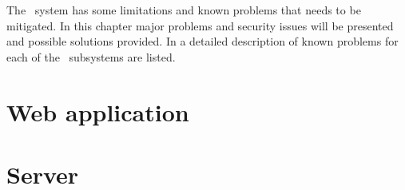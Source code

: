 The \appName\ system has some limitations and known problems that needs to be
mitigated. In this chapter major problems and security issues will be presented
and possible solutions provided. In  a detailed
description of known problems for each of the \appName\ subsystems are listed.

\section{Web application}

\FloatBarrier

\section{Server}




